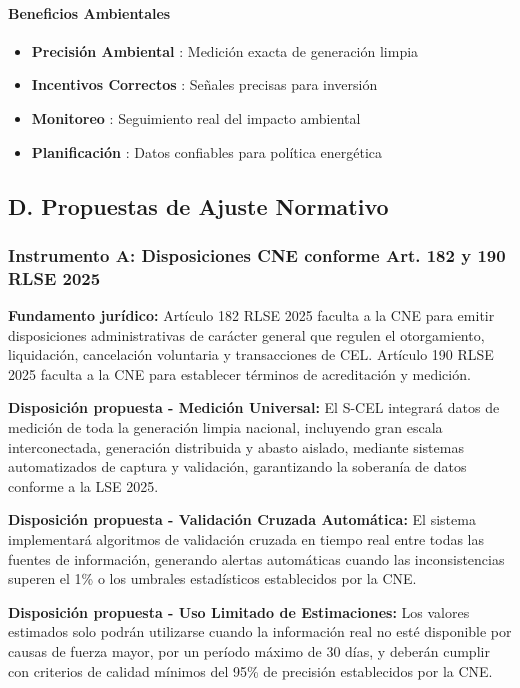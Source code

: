\documentclass{cel}
\begin{document}
\paragraph{Beneficios Ambientales}
\nopagebreak

\begin{itemize}
\item \textbf{Precisión Ambiental} : Medición exacta de generación limpia
\item \textbf{Incentivos Correctos} : Señales precisas para inversión
\item \textbf{Monitoreo} : Seguimiento real del impacto ambiental
\item \textbf{Planificación} : Datos confiables para política energética


\end{itemize}
\subsection{D. Propuestas de Ajuste Normativo}
\nopagebreak

\subsubsection{Instrumento A: Disposiciones CNE conforme Art. 182 y 190 RLSE 2025}
\nopagebreak

\textbf{Fundamento jurídico:} Artículo 182 RLSE 2025 faculta a la CNE para emitir disposiciones administrativas de carácter general que regulen el otorgamiento, liquidación, cancelación voluntaria y transacciones de CEL. Artículo 190 RLSE 2025 faculta a la CNE para establecer términos de acreditación y medición.


\textbf{Disposición propuesta - Medición Universal:} \textquotedbl{}El S-CEL integrará datos de medición de toda la generación limpia nacional, incluyendo gran escala interconectada, generación distribuida y abasto aislado, mediante sistemas automatizados de captura y validación, garantizando la soberanía de datos conforme a la LSE 2025.\textquotedbl{}


\textbf{Disposición propuesta - Validación Cruzada Automática:} \textquotedbl{}El sistema implementará algoritmos de validación cruzada en tiempo real entre todas las fuentes de información, generando alertas automáticas cuando las inconsistencias superen el 1\% o los umbrales estadísticos establecidos por la CNE.\textquotedbl{}


\textbf{Disposición propuesta - Uso Limitado de Estimaciones:} \textquotedbl{}Los valores estimados solo podrán utilizarse cuando la información real no esté disponible por causas de fuerza mayor, por un período máximo de 30 días, y deberán cumplir con criterios de calidad mínimos del 95\% de precisión establecidos por la CNE.\textquotedbl{}
\end{document}
